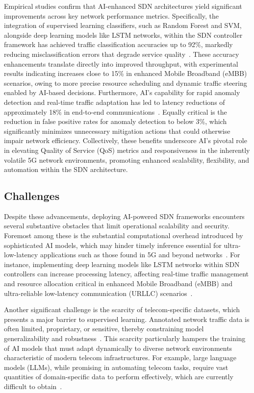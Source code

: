 \documentclass[sigconf]{acmart}
\begin{document}
Empirical studies confirm that AI-enhanced SDN architectures yield significant improvements across key network performance metrics. Specifically, the integration of supervised learning classifiers, such as Random Forest and SVM, alongside deep learning models like LSTM networks, within the SDN controller framework has achieved traffic classification accuracies up to 92\%, markedly reducing misclassification errors that degrade service quality~\cite{ref52}. These accuracy enhancements translate directly into improved throughput, with experimental results indicating increases close to 15\% in enhanced Mobile Broadband (eMBB) scenarios, owing to more precise resource scheduling and dynamic traffic steering enabled by AI-based decisions. Furthermore, AI’s capability for rapid anomaly detection and real-time traffic adaptation has led to latency reductions of approximately 18\% in end-to-end communications~\cite{ref52}. Equally critical is the reduction in false positive rates for anomaly detection to below 3\%, which significantly minimizes unnecessary mitigation actions that could otherwise impair network efficiency. Collectively, these benefits underscore AI’s pivotal role in elevating Quality of Service (QoS) metrics and responsiveness in the inherently volatile 5G network environments, promoting enhanced scalability, flexibility, and automation within the SDN architecture.

\subsection{Challenges}

Despite these advancements, deploying AI-powered SDN frameworks encounters several substantive obstacles that limit operational scalability and security. Foremost among these is the substantial computational overhead introduced by sophisticated AI models, which may hinder timely inference essential for ultra-low-latency applications such as those found in 5G and beyond networks~\cite{ref52}. For instance, implementing deep learning models like LSTM networks within SDN controllers can increase processing latency, affecting real-time traffic management and resource allocation critical in enhanced Mobile Broadband (eMBB) and ultra-reliable low-latency communication (URLLC) scenarios~\cite{ref52}. 

Another significant challenge is the scarcity of telecom-specific datasets, which presents a major barrier to supervised learning. Annotated network traffic data is often limited, proprietary, or sensitive, thereby constraining model generalizability and robustness~\cite{ref7}. This scarcity particularly hampers the training of AI models that must adapt dynamically to diverse network environments characteristic of modern telecom infrastructures. For example, large language models (LLMs), while promising in automating telecom tasks, require vast quantities of domain-specific data to perform effectively, which are currently difficult to obtain~\cite{ref7}.
\end{document}

